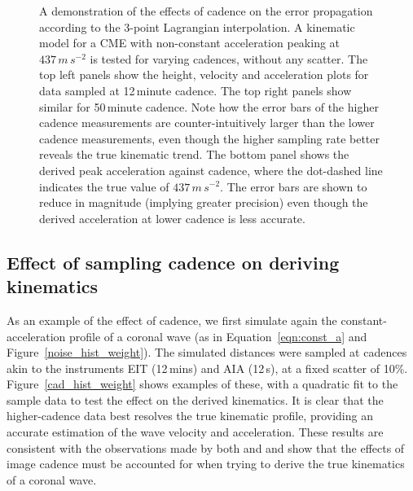 \documentclass[structabstract]{aa}
\begin{document}
\begin{figure}[!t]
\caption{A demonstration of the effects of cadence on the error propagation according to the 3-point Lagrangian interpolation. A kinematic model for a CME with non-constant acceleration peaking at $437\,m\,s^{-2}$ is tested for varying cadences, without any scatter. The top left panels show the height, velocity and acceleration plots for data sampled at 12\,minute cadence. The top right panels show similar for 50\,minute cadence. Note how the error bars of the higher cadence measurements are counter-intuitively larger than the lower cadence measurements, even though the higher sampling rate better reveals the true kinematic trend. The bottom panel shows the derived peak acceleration against cadence, where the dot-dashed line indicates the true value of $437\,m\,s^{-2}$. The error bars are shown to reduce in magnitude (implying greater precision) even though the derived acceleration at lower cadence is less accurate.}
\label{fig_cadence_hva}
\end{figure}

\subsection{Effect of sampling cadence on deriving kinematics}
\label{subsect:cadence}

As an example of the effect of cadence, we first simulate again the constant-acceleration profile of a coronal wave (as in Equation~\ref{eqn:const_a} and Figure~\ref{noise_hist_weight}). The simulated distances were sampled at cadences akin to the instruments EIT (12\,mins) and AIA (12\,s), at a fixed scatter of 10\%. Figure~\ref{cad_hist_weight} shows examples of these, with a quadratic fit to the sample data to test the effect on the derived kinematics. It is clear that the higher-cadence data best resolves the true kinematic profile, providing an accurate estimation of the wave velocity and acceleration. These results are consistent with the observations made by both \citet{2008ApJ...680L..81L} and \citet{2009ApJ...707..503M} and show that the effects of image cadence must be accounted for when trying to derive the true kinematics of a coronal wave.
\end{document}
